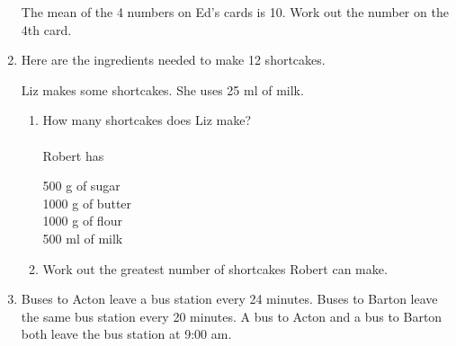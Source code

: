\begin{enumerate}
\begin{figure}[H]
      \end{figure}
      The mean of the 4 numbers on Ed's cards is 10. Work out the number on the 4th card.\\[3cm]\vspace*{0pt}\hfill\dline
      \item Here are the ingredients needed to make 12 shortcakes.
      \begin{center}
      \end{center}
      Liz makes some shortcakes. She uses 25 ml of milk.
      \begin{enumerate}
        \item How many shortcakes does Liz make?\\[2cm]\vspace*{0pt}\hfill\dline\\
        Robert has \par
        \hspace*{2cm}500 g of sugar\\
			  \hspace*{2cm}1000 g of butter\\
			  \hspace*{2cm}1000 g of flour\\
			  \hspace*{2cm}500 ml of milk
        \item Work out the greatest number of shortcakes Robert can make.\\[2cm]\vspace*{0pt}\hfill\dline
      \end{enumerate}
      \item Buses to Acton leave a bus station every 24 minutes. Buses to Barton leave the same bus station every 20 minutes. A bus to Acton and a bus to Barton both leave the bus station at 9:00 am.\par 

\end{enumerate}
